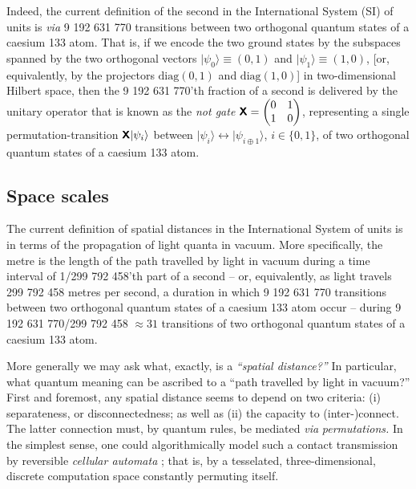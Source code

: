 \documentclass[%
  preprint,
 showpacs,
 showkeys,
 preprintnumbers,
 amsmath,amssymb,
 aps,
  pra,
  longbibliography,
 ]{revtex4-1}
\begin{document}
Indeed, the current definition of the second in the International System (SI) of units
is {\it via} 9 192 631 770 transitions between two orthogonal quantum states of a caesium 133 atom.
That is, if we encode the two ground states by the subspaces spanned by the two orthogonal vectors
$\vert \psi_0 \rangle \equiv (0,1)$ and $\vert \psi_1 \rangle \equiv (1,0)$,
[or, equivalently, by the projectors $\text{diag}(0,1)$    and  $\text{diag}(1,0)$]
in two-dimensional Hilbert space,
then the 9 192 631 770'th fraction of a second is delivered by the unitary operator that is known as the
{\em not gate} \cite{mermin-07} $\textsf{\textbf{X}}
=   \begin{pmatrix}0& 1\\1&0
\end{pmatrix}
$,
representing a single permutation-transition $\textsf{\textbf{X}}\vert \psi_i \rangle $  between $\vert \psi_i \rangle  \leftrightarrow \vert \psi_{i\oplus 1} \rangle $,
$i\in \{ 0, 1\}$,
of two orthogonal quantum states of a caesium 133 atom.

\subsection{Space scales}

The current definition of spatial distances in the International System of units
is in terms of the propagation of light quanta in vacuum.
More specifically, the metre is the length of the path travelled by light in vacuum during a time interval
of 1/299 792 458'th part of a second
--
or, equivalently,
as light travels 299 792 458 metres per second,
a duration in which 9 192 631 770 transitions between two orthogonal quantum states of a caesium 133 atom occur
--
during
9 192 631 770/299 792 458 $\approx 31$ transitions of two orthogonal quantum states of a caesium 133 atom.

More generally we may ask
what, exactly, is a {\em ``spatial distance?''}
In particular, what quantum meaning can be ascribed to a ``path travelled by light in vacuum?''
First and foremost, any spatial distance seems to depend on two criteria:
(i) separateness, or disconnectedness; as well as
(ii) the capacity to (inter-)connect.
The latter connection must, by quantum rules,
be mediated {\it via} {\em permutations.}
In the simplest sense, one could algorithmically model such a contact transmission by reversible {\em cellular automata}
\cite{fredkin,svozil-1996-time,thooft-2013}; that is, by a tesselated, three-dimensional, discrete computation space \cite{zuse-67}
constantly permuting itself.
\end{document}

